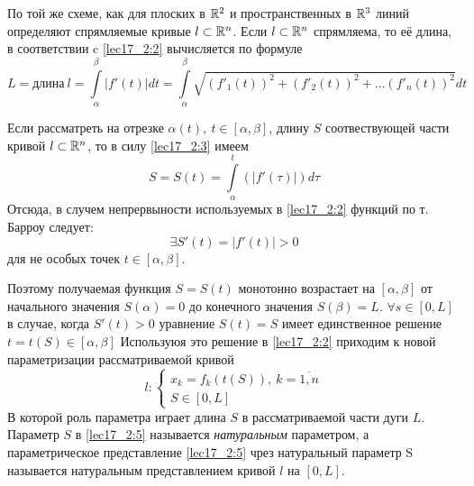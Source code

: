 \documentclass[../../main.tex]{subfiles}
\begin{document}
По той же схеме, как для плоских в $\mathbb{R}^2$ и пространственных в  $\mathbb{R}^3$ 
линий определяют спрямляемые кривые $l \subset \mathbb{R}^n$.
Если $l \subset \mathbb{R}^n$ спрямляема, то её длина, 
в соответствии c \eqref{lec17_2:2}
вычисляется по формуле
\begin{equation}
 \label{lec17_2:3}
 L = \text{длина}\ l = \int\limits_\alpha^\beta|f'(t)|dt =  
 \int\limits_\alpha^\beta\sqrt{(f'_1(t))^2 + (f'_2(t))^2 
 + \dots (f'_n(t))^2}dt
\end{equation}

Если рассматреть на отрезке $\alpha(t),\ t \in \left[\alpha, \beta\right]$,
длину $S$ соотвествующей части кривой $l \subset \mathbb{R}^n$, 
то в силу \eqref{lec17_2:3} имеем
\begin{equation}
\label{lec17_2:4}
 S = S(t) = \int\limits_\alpha^t(|f'(\tau)|)d\tau
\end{equation}
Отсюда, в случем непрервыности используемых в \eqref{lec17_2:2} 
функций  по т. Барроу следует:
\[
  \exists S'(t) = |f'(t)|>0
\]
для не особых точек $t \in \left[\alpha, \beta \right]$.

Поэтому получаемая функция $S = S(t)$ монотонно возрастает 
на $\left[\alpha, \beta \right]$ от начального значения  $S(\alpha) = 0$ 
до конечного значения $S(\beta) = L$.
$\forall s \in \left[0, L \right]$ в случае, когда $S'(t) > 0$  уравнение
$S(t) = S$ имеет единственное решение 
$t = t(S) \in \left[\alpha, \beta \right]$
Используюя это решение в \eqref{lec17_2:2} приходим к новой параметризации
рассматриваемой кривой
\begin{equation}
 \label{lec17_2:5}
 l:
 \left\{
   \begin{array}{cc}
      x_k = f_k(t(S)),\ k = \overline{1,n}\\
      S \in \left[0, L \right]
   \end{array}
 \right.
\end{equation}
В которой роль параметра играет длина $S$ в рассматриваемой части дуги $L$.
Параметр $S$ в \eqref{lec17_2:5} называется \emph{натуральным} параметром, 
а параметрическое представление \eqref{lec17_2:5} чрез натуральный параметр S
называется натуральным представлением кривой $l$ на $\left[ 0, L \right]$.
\end{document}
